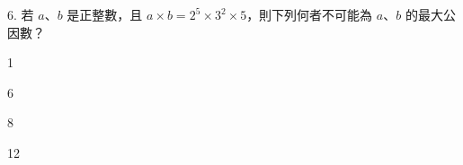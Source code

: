 \documentclass[12pt]{article}
\begin{document}
\begin{problem}
  \item[6.] 若 $a$、$b$ 是正整數，且 $a \times b = 2^5 \times 3^2 \times 5$，則下列何者不可能為 $a$、$b$ 的最大公因數？
  \begin{choices}
    \item 1
    \item 6
    \item 8
    \item 12
  \end{choices}
\end{problem}
\end{document}
